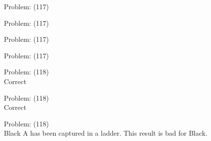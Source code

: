 \documentclass[11pt]{article}
\begin{document}
\begin{minipage}[t]{0.5\textwidth}
  {\centering
  
  Problem: (117)\\
  
  }
\end{minipage}
\begin{minipage}[t]{0.5\textwidth}
  {\centering
  
  Problem: (117)\\
  
  }
\end{minipage}
\begin{minipage}[t]{0.5\textwidth}
  {\centering
  
  Problem: (117)\\
  
  }
\end{minipage}
\begin{minipage}[t]{0.5\textwidth}
  {\centering
  
  Problem: (117)\\
  
  }
\end{minipage}
\begin{minipage}[t]{0.5\textwidth}
  {\centering
  
  Problem: (118)\\
  Correct\\
  }
\end{minipage}
\begin{minipage}[t]{0.5\textwidth}
  {\centering
  
  Problem: (118)\\
  Correct\\
  }
\end{minipage}
\begin{minipage}[t]{0.5\textwidth}
  {\centering
  
  Problem: (118)\\
  Black A has been captured in a ladder. This result is bad for Black.\\
  }
\end{minipage}
\end{document}
